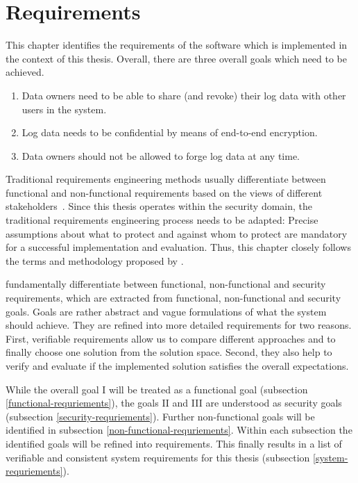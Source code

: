 \documentclass[../main.tex]{subfiles}
\begin{document}
\chapter{Requirements}

This chapter identifies the requirements of the software which is implemented in the context of this thesis.
Overall, there are three overall goals which need to be achieved. 

\begin{enumerate}[label=\Roman*.]
    \item Data owners need to be able to share (and revoke) their log data with other users in the system.
	\item Log data needs to be confidential by means of end-to-end encryption.
    \item Data owners should not be allowed to forge log data at any time.
\end{enumerate}


Traditional requirements engineering methods usually differentiate between functional and non-functional requirements based on the views of different stakeholders~.
Since this thesis operates within the security domain, the traditional requirements engineering process needs to be adapted: 
Precise assumptions about what to protect and against whom to protect are mandatory for a successful implementation and evaluation.
Thus, this chapter closely follows the terms and methodology proposed by \citeauthor{Fabian2010} \cite{Fabian2010}.

\citeauthor{Fabian2010} fundamentally differentiate between functional, non-functional and security requirements, which are extracted from functional, non-functional and security goals.
Goals are rather abstract and vague formulations of what the system should achieve. 
They are refined into more detailed requirements for two reasons.
First, verifiable requirements allow us to compare different approaches and to finally choose one solution from the solution space. 
Second, they also help to verify and evaluate if the implemented solution satisfies the overall expectations. \cite{Fabian2010}

While the overall goal I will be treated as a functional goal (subsection \ref{functional-requriements}), the goals II and III are understood as security goals (subsection \ref{security-requriements}).
Further non-functional goals will be identified in subsection \ref{non-functional-requriements}.
Within each subsection the identified goals will be refined into requirements.
This finally results in a list of verifiable and consistent system requirements for this thesis (subsection \ref{system-requriements}).
\end{document}
